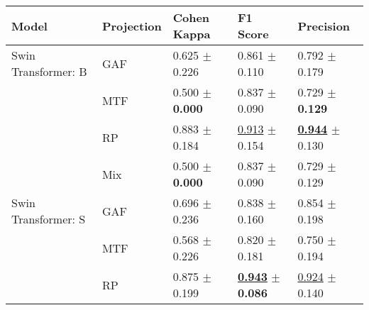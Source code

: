
\begin{tabular}[t]{lllll}
\toprule
Model & Projection & Cohen Kappa & F1 Score & Precision \\
\midrule
Swin Transformer: B & GAF & \textcolor[rgb]{0.6842105263,0.3157894737,0}{0.625} $\pm$ \textcolor[rgb]{0.8660254038,0.1339745962,0}{0.226} & \textcolor[rgb]{0.4608501119,0.5000000000,0}{0.861} $\pm$ \textcolor[rgb]{0.2381568728,0.5000000000,0}{0.110} & \textcolor[rgb]{0.7096774194,0.2903225806,0}{0.792} $\pm$ \textcolor[rgb]{0.7294531592,0.2705468408,0}{0.179} \\
 & MTF & \textcolor[rgb]{1.0000000000,0.0000000000,0}{0.500} $\pm$ \textbf{\textcolor[rgb]{0.0000000000,0.5000000000,0}{0.000}} & \textcolor[rgb]{0.5950782998,0.4049217002,0}{0.837} $\pm$ \textcolor[rgb]{0.0338709016,0.5000000000,0}{0.090} & \textcolor[rgb]{1.0000000000,0.0000000000,0}{0.729} $\pm$ \textbf{\textcolor[rgb]{0.0000000000,0.5000000000,0}{0.129}} \\
 & RP & \textcolor[rgb]{0.0315789474,0.5000000000,0}{0.883} $\pm$ \textcolor[rgb]{0.7039570694,0.2960429306,0}{0.184} & \underline{\textcolor[rgb]{0.1677852349,0.5000000000,0}{0.913}} $\pm$ \textcolor[rgb]{0.6684556411,0.3315443589,0}{0.154} & \underline{\textbf{\textcolor[rgb]{0.0000000000,0.5000000000,0}{0.944}}} $\pm$ \textcolor[rgb]{0.0146408820,0.5000000000,0}{0.130} \\
 & Mix & \textcolor[rgb]{1.0000000000,0.0000000000,0}{0.500} $\pm$ \textbf{\textcolor[rgb]{0.0000000000,0.5000000000,0}{0.000}} & \textcolor[rgb]{0.5950782998,0.4049217002,0}{0.837} $\pm$ \textcolor[rgb]{0.0338709016,0.5000000000,0}{0.090} & \textcolor[rgb]{1.0000000000,0.0000000000,0}{0.729} $\pm$ \textcolor[rgb]{0.0000000000,0.5000000000,0}{0.129} \\
Swin Transformer: S & GAF & \textcolor[rgb]{0.5052631579,0.4947368421,0}{0.696} $\pm$ \textcolor[rgb]{0.9035424112,0.0964575888,0}{0.236} & \textcolor[rgb]{0.5883668904,0.4116331096,0}{0.838} $\pm$ \textcolor[rgb]{0.7289096871,0.2710903129,0}{0.160} & \textcolor[rgb]{0.4193548387,0.5000000000,0}{0.854} $\pm$ \textcolor[rgb]{1.0000000000,0.0000000000,0}{0.198} \\
 & MTF & \textcolor[rgb]{0.8277511962,0.1722488038,0}{0.568} $\pm$ \textcolor[rgb]{0.8660254038,0.1339745962,0}{0.226} & \textcolor[rgb]{0.6931055522,0.3068944478,0}{0.820} $\pm$ \textcolor[rgb]{0.9386830080,0.0613169920,0}{0.181} & \textcolor[rgb]{0.9032258065,0.0967741935,0}{0.750} $\pm$ \textcolor[rgb]{0.9339473934,0.0660526066,0}{0.194} \\
 & RP & \textcolor[rgb]{0.0526315789,0.5000000000,0}{0.875} $\pm$ \textcolor[rgb]{0.7637626158,0.2362373842,0}{0.199} & \underline{\textbf{\textcolor[rgb]{0.0000000000,0.5000000000,0}{0.943}}} $\pm$ \textbf{\textcolor[rgb]{0.0000000000,0.5000000000,0}{0.086}} & \underline{\textcolor[rgb]{0.0967741935,0.5000000000,0}{0.924}} $\pm$ \textcolor[rgb]{0.1578953607,0.5000000000,0}{0.140} \\

\end{tabular}

